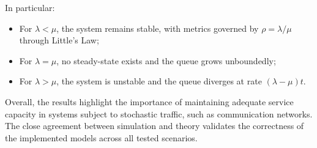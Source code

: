 \documentclass[12pt]{article}
\begin{document}
In particular:
\begin{itemize}
    \item For $\lambda < \mu$, the system remains stable, with metrics governed by $\rho = \lambda/\mu$ through Little's Law;
    \item For $\lambda = \mu$, no steady-state exists and the queue grows unboundedly;
    \item For $\lambda > \mu$, the system is unstable and the queue diverges at rate $(\lambda - \mu)t$.
\end{itemize}

Overall, the results highlight the importance of maintaining adequate service capacity in systems subject to stochastic traffic, such as communication networks. The close agreement between simulation and theory validates the correctness of the implemented models across all tested scenarios.
\end{document}
